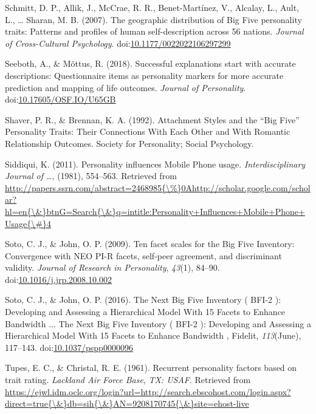 \documentclass[,man,floatsintext]{apa6}
\begin{document}
\hypertarget{ref-Schmitt2007}{}
Schmitt, D. P., Allik, J., McCrae, R. R., Benet-Martínez, V., Alcalay,
L., Ault, L., \ldots{} Sharan, M. B. (2007). The geographic distribution
of Big Five personality traits: Patterns and profiles of human
self-description across 56 nations. \emph{Journal of Cross-Cultural
Psychology}.
doi:\href{https://doi.org/10.1177/0022022106297299}{10.1177/0022022106297299}

\hypertarget{ref-Seeboth2018}{}
Seeboth, A., \& Mõttus, R. (2018). Successful explanations start with
accurate descriptions: Questionnaire items as personality markers for
more accurate prediction and mapping of life outcomes. \emph{Journal of
Personality}.
doi:\href{https://doi.org/10.17605/OSF.IO/U65GB}{10.17605/OSF.IO/U65GB}

\hypertarget{ref-Shaver1992}{}
Shaver, P. R., \& Brennan, K. A. (1992). Attachment Styles and the ``Big
Five'' Personality Traits: Their Connections With Each Other and With
Romantic Relationship Outcomes. Society for Personality; Social
Psychology.

\hypertarget{ref-Siddiqui2011}{}
Siddiqui, K. (2011). Personality influences Mobile Phone usage.
\emph{Interdisciplinary Journal of \ldots{}}, (1981), 554--563.
Retrieved from
\href{http://papers.ssrn.com/abstract=2468985\%7B/\%\%7D0Ahttp://scholar.google.com/scholar?hl=en\%7B/\&\%7DbtnG=Search\%7B/\&\%7Dq=intitle:Personality+Influences+Mobile+Phone+Usage\%7B/\#\%7D4}{http://papers.ssrn.com/abstract=2468985\{\textbackslash{}\%\}0Ahttp://scholar.google.com/scholar?hl=en\{\textbackslash{}\&\}btnG=Search\{\textbackslash{}\&\}q=intitle:Personality+Influences+Mobile+Phone+Usage\{\textbackslash{}\#\}4}

\hypertarget{ref-SotoJohn2009}{}
Soto, C. J., \& John, O. P. (2009). Ten facet scales for the Big Five
Inventory: Convergence with NEO PI-R facets, self-peer agreement, and
discriminant validity. \emph{Journal of Research in Personality},
\emph{43}(1), 84--90.
doi:\href{https://doi.org/10.1016/j.jrp.2008.10.002}{10.1016/j.jrp.2008.10.002}

\hypertarget{ref-SotoJohn2016}{}
Soto, C. J., \& John, O. P. (2016). The Next Big Five Inventory ( BFI-2
): Developing and Assessing a Hierarchical Model With 15 Facets to
Enhance Bandwidth ... The Next Big Five Inventory ( BFI-2 ): Developing
and Assessing a Hierarchical Model With 15 Facets to Enhance Bandwidth ,
Fidelit, \emph{113}(June), 117--143.
doi:\href{https://doi.org/10.1037/pspp0000096}{10.1037/pspp0000096}

\hypertarget{ref-TupesChristal1961}{}
Tupes, E. C., \& Christal, R. E. (1961). Recurrent personality factors
based on trait rating. \emph{Lackland Air Force Base}, \emph{TX: USAF}.
Retrieved from
\href{https://ejwl.idm.oclc.org/login?url=http://search.ebscohost.com/login.aspx?direct=true\%7B/\&\%7Ddb=sih\%7B/\&\%7DAN=9208170745\%7B/\&\%7Dsite=ehost-live}{https://ejwl.idm.oclc.org/login?url=http://search.ebscohost.com/login.aspx?direct=true\{\textbackslash{}\&\}db=sih\{\textbackslash{}\&\}AN=9208170745\{\textbackslash{}\&\}site=ehost-live}
\end{document}
